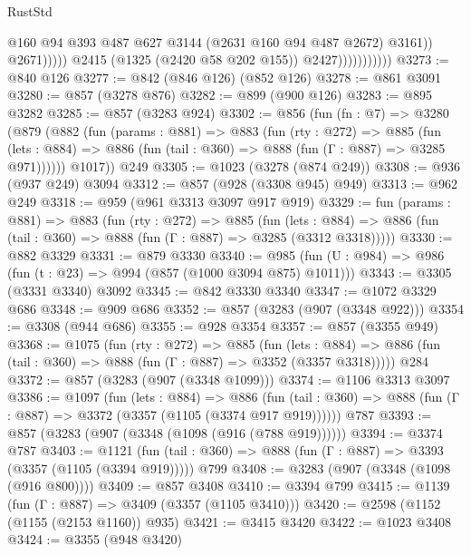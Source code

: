 \begin{lexlean}{RustStd}
\begin{coremodule}
{\begin{coremodule}
{{{{{{{{{                                        @160
                                        @94
                                        @393
                                        @487
                                        @627
                                        @3144
                                        (@2631 @160 @94 @487 @2672)
                                        @3161))
                                    @2671)))))
                          @2415
                          (@1325 (@2420 @58 @202 @155))
                          @2427)))))))))))
@3273 := @840 @126
@3277 := @842 (@846 @126) (@852 @126)
@3278 := @861 @3091
@3280 := @857 (@3278 @876)
@3282 := @899 (@900 @126)
@3283 := @895 @3282
@3285 := @857 (@3283 @924)
@3302 := @856
    (fun (fn : @7) =>
    @3280
      (@879
        (@882
          (fun (params : @881) =>
          @883
            (fun (rty : @272) =>
            @885
              (fun (lets : @884) =>
              @886 (fun (tail : @360) => @888 (fun (Γ : @887) => @3285 @971))))))
        @1017))
    @249
@3305 := @1023 (@3278 (@874 @249))
@3308 := @936 (@937 @249) @3094
@3312 := @857 (@928 (@3308 @945) @949)
@3313 := @962 @249
@3318 := @959 (@961 @3313 @3097 @917 @919)
@3329 := fun (params : @881) =>
  @883
    (fun (rty : @272) =>
    @885
      (fun (lets : @884) =>
      @886 (fun (tail : @360) => @888 (fun (Γ : @887) => @3285 (@3312 @3318)))))
@3330 := @882 @3329
@3331 := @879 @3330
@3340 := @985 (fun (U : @984) => @986 (fun (t : @23) => @994 (@857 (@1000 @3094 @875) @1011)))
@3343 := @3305 (@3331 @3340) @3092
@3345 := @842 @3330 @3340
@3347 := @1072 @3329 @686
@3348 := @909 @686
@3352 := @857 (@3283 (@907 (@3348 @922)))
@3354 := @3308 (@944 @686)
@3355 := @928 @3354
@3357 := @857 (@3355 @949)
@3368 := @1075
    (fun (rty : @272) =>
    @885
      (fun (lets : @884) =>
      @886 (fun (tail : @360) => @888 (fun (Γ : @887) => @3352 (@3357 @3318)))))
    @284
@3372 := @857 (@3283 (@907 (@3348 @1099)))
@3374 := @1106 @3313 @3097
@3386 := @1097
    (fun (lets : @884) =>
    @886 (fun (tail : @360) => @888 (fun (Γ : @887) => @3372 (@3357 (@1105 (@3374 @917 @919))))))
    @787
@3393 := @857 (@3283 (@907 (@3348 (@1098 (@916 (@788 @919))))))
@3394 := @3374 @787
@3403 := @1121
    (fun (tail : @360) => @888 (fun (Γ : @887) => @3393 (@3357 (@1105 (@3394 @919)))))
    @799
@3408 := @3283 (@907 (@3348 (@1098 (@916 @800))))
@3409 := @857 @3408
@3410 := @3394 @799
@3415 := @1139 (fun (Γ : @887) => @3409 (@3357 (@1105 @3410)))
@3420 := @2598 (@1152 (@1155 (@2153 @1160)) @935)
@3421 := @3415 @3420
@3422 := @1023 @3408
@3424 := @3355 (@948 @3420)
}}}}}}}}}
\end{coremodule}}
\end{coremodule}
\end{lexlean}
